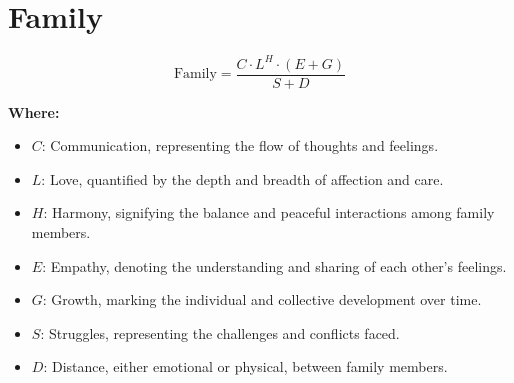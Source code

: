 \chapter{Family}

\begin{equation}
\text{Family} = \frac{C \cdot L^{H} \cdot (E + G)}{S + D}
\end{equation}

\textbf{Where:}

\begin{itemize}
    \item $C$: Communication, representing the flow of thoughts and feelings.
    \item $L$: Love, quantified by the depth and breadth of affection and care.
    \item $H$: Harmony, signifying the balance and peaceful interactions among family members.
    \item $E$: Empathy, denoting the understanding and sharing of each other's feelings.
    \item $G$: Growth, marking the individual and collective development over time.
    \item $S$: Struggles, representing the challenges and conflicts faced.
    \item $D$: Distance, either emotional or physical, between family members.
\end{itemize}